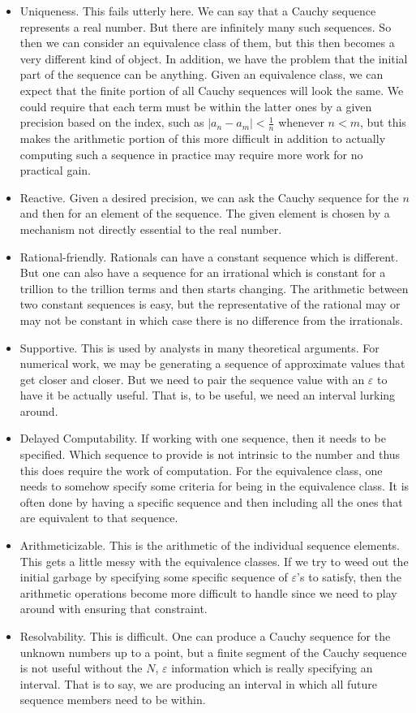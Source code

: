 \documentclass[12pt]{article}
\begin{document}
\begin{itemize}
    \item Uniqueness. This fails utterly here. We can say that a Cauchy sequence represents a real number. But there are infinitely many such sequences. So then we can consider an equivalence class of them, but this then becomes a very different kind of object. In addition, we have the problem that the initial part of the sequence can be anything. Given an equivalence class, we can expect that the finite portion of all Cauchy sequences will look the same. We could require that each term must be within the latter ones by a given precision based on the index, such as $|a_n - a_m| < \tfrac{1}{n}$ whenever $n < m$, but this makes the arithmetic portion of this more difficult in addition to actually computing such a sequence in practice may require more work for no practical gain. 
    \item Reactive. Given a desired precision, we can ask the Cauchy sequence for the $n$ and then for an element of the sequence. The given element is chosen by a mechanism not directly essential to the real number. 
    \item Rational-friendly. Rationals can have a constant sequence which is different. But one can also have a sequence for an irrational which is constant for a trillion to the trillion terms and then starts changing. The arithmetic between two constant sequences is easy, but the representative of the rational may or may not be constant in which case there is no difference from the irrationals.   
    \item Supportive. This is used by analysts in many theoretical arguments. For numerical work, we may be generating a sequence of approximate values that get closer and closer. But we need to pair the sequence value with an $\varepsilon$ to have it be actually useful. That is, to be useful, we need an interval lurking around. 
    \item Delayed Computability. If working with one sequence, then it needs to be specified. Which sequence to provide is not intrinsic to the number and thus this does require the work of computation.  For the equivalence class, one needs to somehow specify some criteria for being in the equivalence class. It is often done by having a specific sequence and then including all the ones that are equivalent to that sequence. 
    \item Arithmeticizable. This is the arithmetic of the individual sequence elements. This gets a little messy with the equivalence classes. If we try to weed out the initial garbage by specifying some specific sequence of $\varepsilon$'s to satisfy, then the arithmetic operations become more difficult to handle since we need to play around with ensuring that constraint.  
    \item Resolvability. This is difficult. One can produce a Cauchy sequence for the unknown numbers up to a point, but a finite segment of the Cauchy sequence is not useful without the $N$, $\varepsilon$ information which is really specifying an interval. That is to say, we are producing an interval in which all future sequence members need to be within.  
\end{itemize}
\end{document}
